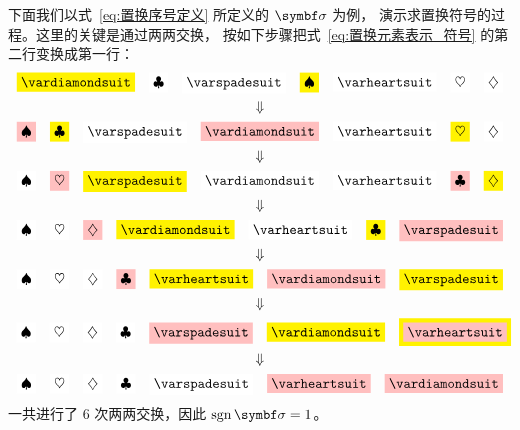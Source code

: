 	下面我们以式~\eqref{eq:置换序号定义} 所定义的 $\Perm{\sigma}$ 为例，
	演示求置换符号的过程。这里的关键是通过两两交换，
	按如下步骤把式~\eqref{eq:置换元素表示_符号} 的第二行变换成第一行：
	\begin{gather*}
		\mqty{
			\hl{\vardiamondsuit} & \hlw{\clubsuit} & \hlw{\varspadesuit} &
				\hl{\spadesuit} & \hlw{\varheartsuit} & \hlw{\heartsuit} &
				\hlw{\diamondsuit}
		} \\
		\mqty{ & & & \Downarrow & & & } \\
		\mqty{
			\hl[pink]{\spadesuit} & \hl{\clubsuit} & \hlw{\varspadesuit} &
				\hl[pink]{\vardiamondsuit} & \hlw{\varheartsuit} &
				\hl{\heartsuit} & \hlw{\diamondsuit}
		} \\
		\mqty{ & & & \Downarrow & & & } \\
		\mqty{
			\hlw{\spadesuit} & \hl[pink]{\heartsuit} & \hl{\varspadesuit} &
				\hlw{\vardiamondsuit} & \hlw{\varheartsuit} &
				\hl[pink]{\clubsuit} & \hl{\diamondsuit}
		} \\
		\mqty{ & & & \Downarrow & & & } \\
		\mqty{
			\hlw{\spadesuit} & \hlw{\heartsuit} & \hl[pink]{\diamondsuit} &
				\hl{\vardiamondsuit} & \hlw{\varheartsuit} & \hl{\clubsuit} &
				\hl[pink]{\varspadesuit}
		} \\
		\mqty{ & & & \Downarrow & & & } \\
		\mqty{
			\hlw{\spadesuit} & \hlw{\heartsuit} & \hlw{\diamondsuit} &
				\hl[pink]{\clubsuit} & \hl{\varheartsuit} &
				\hl[pink]{\vardiamondsuit} & \hl{\varspadesuit}
		} \\
		\mqty{ & & & \Downarrow & & & } \\
		\phantom{\mspace{10mu}}\mqty{
			\hlw{\spadesuit} & \hlw{\heartsuit} & \hlw{\diamondsuit} &
				\hlw{\clubsuit} & \hl[pink]{\varspadesuit} &
				\hl{\vardiamondsuit} &
				\hl{\hl[pink]{\varheartsuit}}
		} \\
		\mqty{ & & & \Downarrow & & & } \\
		\mqty{
			\hlw{\spadesuit} & \hlw{\heartsuit} & \hlw{\diamondsuit} &
				\hlw{\clubsuit} & \hlw{\varspadesuit} &
				\hl[pink]{\varheartsuit} & \hl[pink]{\vardiamondsuit}
		}
	\end{gather*}
	一共进行了 6 次两两交换，因此 $\sign\Perm{\sigma}=1$。
	
